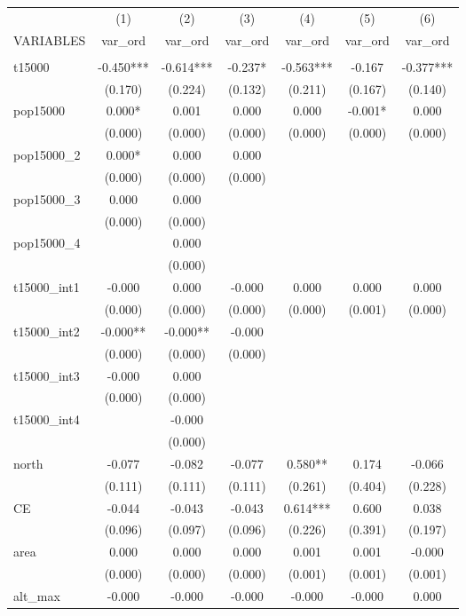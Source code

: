 \documentclass[]{article}
\begin{document}
\begin{tabular}{lcccccc} \hline
 & (1) & (2) & (3) & (4) & (5) & (6) \\
VARIABLES & var\_ord & var\_ord & var\_ord & var\_ord & var\_ord & var\_ord \\ \hline
 &  &  &  &  &  &  \\
t15000 & -0.450*** & -0.614*** & -0.237* & -0.563*** & -0.167 & -0.377*** \\
 & (0.170) & (0.224) & (0.132) & (0.211) & (0.167) & (0.140) \\
pop15000 & 0.000* & 0.001 & 0.000 & 0.000 & -0.001* & 0.000 \\
 & (0.000) & (0.000) & (0.000) & (0.000) & (0.000) & (0.000) \\
pop15000\_2 & 0.000* & 0.000 & 0.000 &  &  &  \\
 & (0.000) & (0.000) & (0.000) &  &  &  \\
pop15000\_3 & 0.000 & 0.000 &  &  &  &  \\
 & (0.000) & (0.000) &  &  &  &  \\
pop15000\_4 &  & 0.000 &  &  &  &  \\
 &  & (0.000) &  &  &  &  \\
t15000\_int1 & -0.000 & 0.000 & -0.000 & 0.000 & 0.000 & 0.000 \\
 & (0.000) & (0.000) & (0.000) & (0.000) & (0.001) & (0.000) \\
t15000\_int2 & -0.000** & -0.000** & -0.000 &  &  &  \\
 & (0.000) & (0.000) & (0.000) &  &  &  \\
t15000\_int3 & -0.000 & 0.000 &  &  &  &  \\
 & (0.000) & (0.000) &  &  &  &  \\
t15000\_int4 &  & -0.000 &  &  &  &  \\
 &  & (0.000) &  &  &  &  \\
north & -0.077 & -0.082 & -0.077 & 0.580** & 0.174 & -0.066 \\
 & (0.111) & (0.111) & (0.111) & (0.261) & (0.404) & (0.228) \\
CE & -0.044 & -0.043 & -0.043 & 0.614*** & 0.600 & 0.038 \\
 & (0.096) & (0.097) & (0.096) & (0.226) & (0.391) & (0.197) \\
area & 0.000 & 0.000 & 0.000 & 0.001 & 0.001 & -0.000 \\
 & (0.000) & (0.000) & (0.000) & (0.001) & (0.001) & (0.001) \\
alt\_max & -0.000 & -0.000 & -0.000 & -0.000 & -0.000 & 0.000 \\

\end{tabular}
\end{document}
